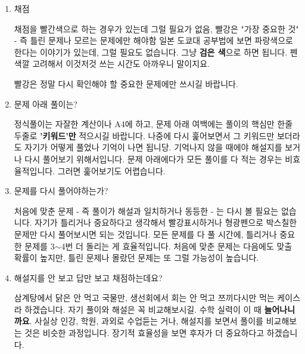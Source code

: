 \vspace{5mm}
\begin{enumerate}

    \item 채점
    \vspace{5mm}

    채점을 빨간색으로 하는 경우가 있는데 그럴 필요가 없음, 빨강은 "가장 중요한 것" - 즉 틀린 문제나 모르는 문제에만 해야함
    일본 도쿄대 공부법에 보면 파랑색으로 한다는 이야기가 있는데, 그럴 필요도 없습니다.
    그냥 \textbf{검은 색}으로 하면 됩니다.
    펜 색깔 고려해서 이것저것 쓰는 시간도 아까우니 말이지요.
    \vspace{5mm}

    빨강은 정말 다시 확인해야 할 중요한 문제에만 쓰시길 바랍니다.
    \vspace{5mm}

    \item 문제 아래 풀이는?
    \vspace{5mm}

    정식풀이는 자잘한 계산이나 A4에 하고, 문제 아래 여백에는 풀이의 핵심만 한줄 두줄로 \textbf{'키워드'만} 적으시길 바랍니다.
    나중에 다시 훑어보면서 그 키워드만 보더라도 자기가 어떻게 풀었나 기억이 나면 됩니당.
    기억나지 않을 때에야 해설지를 보거나 다시 풀어보기 위해서입니다.
    문제 아래에다가 모든 풀이를 다 적는 경우는 비효율적입니다. 그러면 훑어보기도 어렵습니다.
    \vspace{5mm}

    \item  문제를 다시 풀어야하는가?
    \vspace{5mm}

    처음에 맞춘 문제 - 즉 풀이가 해설과 일치하거나 동등한 - 는 다시 볼 필요는 없습니다.
    자기가 틀리거나 중요하다고 생각해서 빨강표시하거나 형광펜으로 박스칠한 문제만 다시 풀어보시면 되는 것입니다.
    모든 문제를 다 풀 시간에, 틀리거나 중요한 문제를 3$\sim$4번 더 돌리는 게 효율적입니다.
    처음에 맞춘 문제는 다음에도 맞출 확률이 높지만, 틀린 문제나 몰랐던 문제는 또 그럴 가능성이 높습니다.
    \vspace{5mm}

    \item 해설지를 안 보고 답만 보고 채점하는데요?
    \vspace{5mm}

    삼계탕에서 닭은 안 먹고 국물만, 생선회에서 회는 안 먹고 쯔끼다시만 먹는 케이스라 하겠습니다.
    자기 풀이와 해설은 꼭 비교해보시길. 수학 실력이 이 때 \textbf{늘어나니까요}.
    사실상 인강, 학원, 과외로 수업듣는 거나, 해설지를 보면서 풀이를 비교해보는 것은 비슷한 과정입니다.
    장기적 효율성을 보면 후자가 더 중요하다고 하겠습니다.
    \vspace{5mm}


\end{enumerate}
